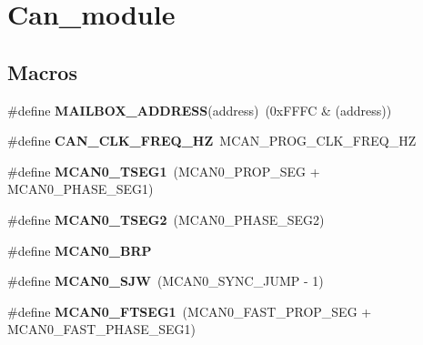 \hypertarget{group__can__module}{}\section{Can\+\_\+module}
\label{group__can__module}
\subsection*{Macros}
\begin{DoxyCompactItemize}
\item 
\mbox{\label{group__can__module_ga8d3f1dc2789b7b70d1a49805e42a486e}} 
\#define {\bfseries M\+A\+I\+L\+B\+O\+X\+\_\+\+A\+D\+D\+R\+E\+SS}(address)~(0x\+F\+F\+F\+C \& (address))
\item 
\mbox{\label{group__can__module_ga9b30d5e2e68c5cd4909042d64f6dea51}} 
\#define {\bfseries C\+A\+N\+\_\+\+C\+L\+K\+\_\+\+F\+R\+E\+Q\+\_\+\+HZ}~M\+C\+A\+N\+\_\+\+P\+R\+O\+G\+\_\+\+C\+L\+K\+\_\+\+F\+R\+E\+Q\+\_\+\+HZ
\item 
\mbox{\label{group__can__module_ga4508df2af71ffe308a4b86e64c57642f}} 
\#define {\bfseries M\+C\+A\+N0\+\_\+\+T\+S\+E\+G1}~(M\+C\+A\+N0\+\_\+\+P\+R\+O\+P\+\_\+\+S\+EG + M\+C\+A\+N0\+\_\+\+P\+H\+A\+S\+E\+\_\+\+S\+E\+G1)
\item 
\mbox{\label{group__can__module_ga25e824bf7b55d718f33c2b7ecfdb7af0}} 
\#define {\bfseries M\+C\+A\+N0\+\_\+\+T\+S\+E\+G2}~(M\+C\+A\+N0\+\_\+\+P\+H\+A\+S\+E\+\_\+\+S\+E\+G2)
\item 
\#define {\bfseries M\+C\+A\+N0\+\_\+\+B\+RP}
\item 
\mbox{\label{group__can__module_gae9962f5e35c06c5310ea4283692065de}} 
\#define {\bfseries M\+C\+A\+N0\+\_\+\+S\+JW}~(M\+C\+A\+N0\+\_\+\+S\+Y\+N\+C\+\_\+\+J\+U\+MP -\/ 1)
\item 
\mbox{\label{group__can__module_ga8e6a74ca923a053c12b770363e400de5}} 
\#define {\bfseries M\+C\+A\+N0\+\_\+\+F\+T\+S\+E\+G1}~(M\+C\+A\+N0\+\_\+\+F\+A\+S\+T\+\_\+\+P\+R\+O\+P\+\_\+\+S\+EG + M\+C\+A\+N0\+\_\+\+F\+A\+S\+T\+\_\+\+P\+H\+A\+S\+E\+\_\+\+S\+E\+G1)
\item 
\mbox{\label{group__can__module_gaf74c9b71eda7671212f04f28288e7dca}} 

\end{DoxyCompactItemize}

